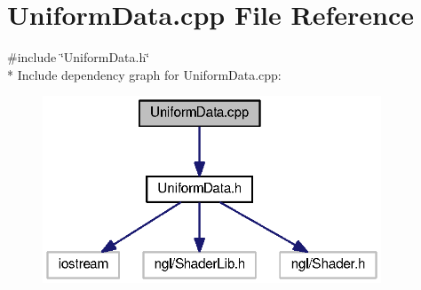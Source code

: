 \section{Uniform\-Data.\-cpp File Reference}
\label{_uniform_data_8cpp}
{\ttfamily \#include \char`\"{}Uniform\-Data.\-h\char`\"{}}\\*
Include dependency graph for Uniform\-Data.\-cpp\-:\nopagebreak
\begin{figure}[H]
\begin{center}
\leavevmode
\includegraphics[width=286pt]{_uniform_data_8cpp__incl}
\end{center}
\end{figure}
